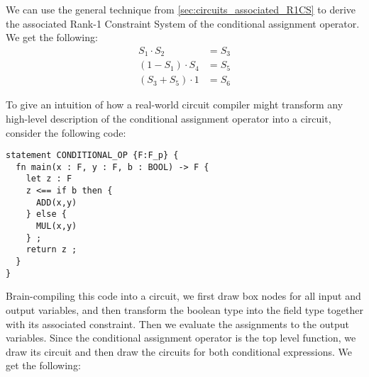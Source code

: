We can use the general technique from \ref{sec:circuits_associated_R1CS} to derive the associated Rank-1 Constraint System of the conditional assignment operator. We get the following:
\begin{align*}
S_1 \cdot S_2 & = S_3 \\
(1 - S_1) \cdot S_4 & = S_5 \\
(S_3 + S_5)\cdot 1 &= S_6
\end{align*}
\begin{example} To give an intuition of how a real-world circuit compiler might transform any high-level description of the conditional assignment operator into a circuit, consider the following  code:
\begin{lstlisting}
statement CONDITIONAL_OP {F:F_p} {
  fn main(x : F, y : F, b : BOOL) -> F {
    let z : F 
    z <== if b then { 
      ADD(x,y) 
    } else { 
      MUL(x,y) 
    } ;
    return z ; 
  }
}
\end{lstlisting}
Brain-compiling this code into a circuit, we first draw box nodes for all input and output variables, and then transform the boolean type into the field type together with its associated constraint. Then we evaluate the assignments to the output variables. Since the conditional assignment operator is the top level function, we draw its circuit and then draw the circuits for both conditional expressions. We get the following:
\begin{center}
\end{center}
\end{example}
